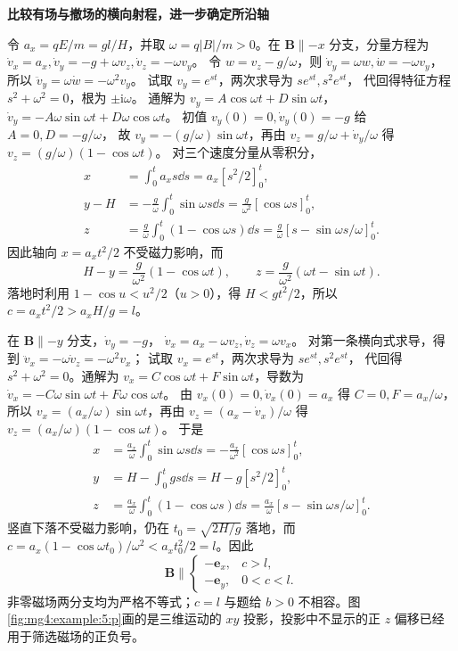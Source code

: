 \begin{solution}
\par\medskip{}\noindent\textbf{比较有场与撤场的横向射程，进一步确定所沿轴}\par\nobreak
令 $a_x=qE/m=gl/H$，并取 $\omega=q|B|/m>0$。在 $\bm B\parallel-x$ 分支，分量方程为
$\dot v_x=a_x,\dot v_y=-g+\omega v_z,\dot v_z=-\omega v_y$。
令 $w=v_z-g/\omega$，则 $\dot v_y=\omega w,\dot w=-\omega v_y$，
所以 $\ddot v_y=\omega\dot w=-\omega^2v_y$。
试取 $v_y=e^{st}$，两次求导为 $se^{st},s^2e^{st}$，
代回得特征方程 $s^2+\omega^2=0$，根为 $\pm\mathrm i\omega$。
通解为 $v_y=A\cos\omega t+D\sin\omega t$，
$\dot v_y=-A\omega\sin\omega t+D\omega\cos\omega t$。
初值 $v_y(0)=0,\dot v_y(0)=-g$ 给 $A=0,D=-g/\omega$，
故 $v_y=-(g/\omega)\sin\omega t$，再由
$v_z=g/\omega+\dot v_y/\omega$ 得
$v_z=(g/\omega)(1-\cos\omega t)$。
对三个速度分量从零积分，
\[
 \begin{aligned}
 x&=\int_0^ta_xs\dd s=a_x[s^2/2]_0^t,\\
 y-H&=-\frac g\omega\int_0^t\sin\omega s\dd s
     =\frac g{\omega^2}[\cos\omega s]_0^t,\\
 z&=\frac g\omega\int_0^t(1-\cos\omega s)\dd s
   =\frac g\omega[s-\sin\omega s/\omega]_0^t.
 \end{aligned}
\]
因此轴向 $x=a_xt^2/2$ 不受磁力影响，而
\[
 H-y=\frac g{\omega^2}(1-\cos\omega t),\qquad
 z=\frac g{\omega^2}(\omega t-\sin\omega t).
\]
落地时利用 $1-\cos u<u^2/2$（$u>0$），得 $H<gt^2/2$，所以 $c=a_xt^2/2> a_xH/g=l$。

在 $\bm B\parallel-y$ 分支，$\dot v_y=-g$，
$\dot v_x=a_x-\omega v_z,\dot v_z=\omega v_x$。
对第一条横向式求导，得到 $\ddot v_x=-\omega\dot v_z=-\omega^2v_x$；
试取 $v_x=e^{st}$，两次求导为 $se^{st},s^2e^{st}$，
代回得 $s^2+\omega^2=0$。通解为
$v_x=C\cos\omega t+F\sin\omega t$，导数为
$\dot v_x=-C\omega\sin\omega t+F\omega\cos\omega t$。
由 $v_x(0)=0,\dot v_x(0)=a_x$ 得 $C=0,F=a_x/\omega$，所以
$v_x=(a_x/\omega)\sin\omega t$，再由
$v_z=(a_x-\dot v_x)/\omega$ 得
$v_z=(a_x/\omega)(1-\cos\omega t)$。
于是
\[
 \begin{aligned}
 x&=\frac{a_x}{\omega}\int_0^t\sin\omega s\dd s
   =-\frac{a_x}{\omega^2}[\cos\omega s]_0^t,\\
 y&=H-\int_0^tgs\dd s=H-g[s^2/2]_0^t,\\
 z&=\frac{a_x}{\omega}\int_0^t(1-\cos\omega s)\dd s
   =\frac{a_x}{\omega}[s-\sin\omega s/\omega]_0^t.
 \end{aligned}
\]
竖直下落不受磁力影响，仍在 $t_0=\sqrt{2H/g}$ 落地，而 $c=a_x(1-\cos\omega t_0)/\omega^2<a_xt_0^2/2=l$。因此
\[
 \boxed{\bm B\parallel\begin{cases}-\bm e_x,&c>l,\\-\bm e_y,&0<c<l.\end{cases}}
\]
非零磁场两分支均为严格不等式；$c=l$ 与题给 $b>0$ 不相容。图\ref{fig:mg4:example:5:p}画的是三维运动的 $xy$ 投影，投影中不显示的正 $z$ 偏移已经用于筛选磁场的正负号。





\end{solution}
